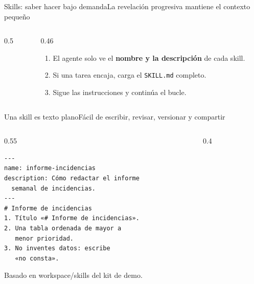 \begin{frame}{Skills: saber hacer bajo demanda}{La revelación progresiva mantiene el contexto pequeño}
	\begin{columns}[c]
		\begin{column}{0.5\textwidth}
			\centering
		\end{column}
		\begin{column}{0.46\textwidth}
			\begin{enumerate}
				\item El agente solo ve el \textbf{nombre y la descripción} de cada skill.
				\item Si una tarea encaja, carga el \texttt{SKILL.md} completo.
				\item Sigue las instrucciones y continúa el bucle.
			\end{enumerate}
		\end{column}
	\end{columns}
\end{frame}

\begin{frame}[fragile]{Una skill es texto plano}{Fácil de escribir, revisar, versionar y compartir}
	\begin{columns}[T]
		\begin{column}{0.55\textwidth}
			\begin{lstlisting}[language={}]
---
name: informe-incidencias
description: Cómo redactar el informe
  semanal de incidencias.
---
# Informe de incidencias
1. Título «# Informe de incidencias».
2. Una tabla ordenada de mayor a
   menor prioridad.
3. No inventes datos: escribe
   «no consta».
\end{lstlisting}
			{\tiny\color{darkgray} Basado en workspace/skills del kit de demo.}
		\end{column}
		\begin{column}{0.4\textwidth}
		\end{column}
	\end{columns}
\end{frame}

